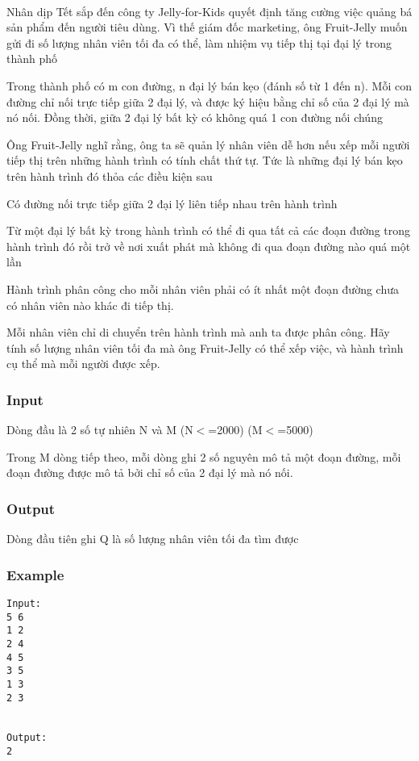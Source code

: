 

 

Nhân dịp Tết sắp đến công ty Jelly-for-Kids quyết định tăng cường việc quảng bá sản phẩm đến người tiêu dùng. Vì thế giám đốc marketing, ông Fruit-Jelly muốn gửi đi số lượng nhân viên tối đa có thể, làm nhiệm vụ tiếp thị tại đại lý trong thành phố

Trong thành phố có m con đường, n đại lý bán kẹo (đánh số từ 1 đến n). Mỗi con đường chỉ nối trực tiếp giữa 2 đại lý, và được ký hiệu bằng chỉ số của 2 đại lý mà nó nối. Đồng thời, giữa 2 đại lý bất kỳ có không quá 1 con đường nối chúng

Ông Fruit-Jelly nghĩ rằng, ông ta sẽ quản lý nhân viên dễ hơn nếu xếp mỗi người tiếp thị trên những hành trình có tính chất thứ tự. Tức là những đại lý bán kẹo trên hành trình đó thỏa các điều kiện sau

Có đường nối trực tiếp giữa 2 đại lý liên tiếp nhau trên hành trình

Từ một đại lý bất kỳ trong hành trình có thể đi qua tất cả các đoạn đường trong hành trình đó rồi trở về nơi xuất phát mà không đi qua đoạn đường nào quá một lần

Hành trình phân công cho mỗi nhân viên phải có ít nhất một đoạn đường chưa có nhân viên nào khác đi tiếp thị.

Mỗi nhân viên chỉ di chuyển trên hành trình mà anh ta được phân công. Hãy tính số lượng nhân viên tối đa mà ông Fruit-Jelly có thể xếp việc, và hành trình cụ thể mà mỗi người được xếp.

\subsubsection{Input}

Dòng đầu là 2 số tự nhiên N và M (N$<$=2000) (M$<$=5000)

Trong M dòng tiếp theo, mỗi dòng ghi 2 số nguyên mô tả một đoạn đường, mỗi đoạn đường được mô tả bởi chỉ số của 2 đại lý mà nó nối.

\subsubsection{Output}

Dòng đầu tiên ghi Q là số lượng nhân viên tối đa tìm được

\subsubsection{Example}
\begin{verbatim}
Input:
5 6
1 2
2 4
4 5
3 5
1 3
2 3


Output:
2
\end{verbatim}